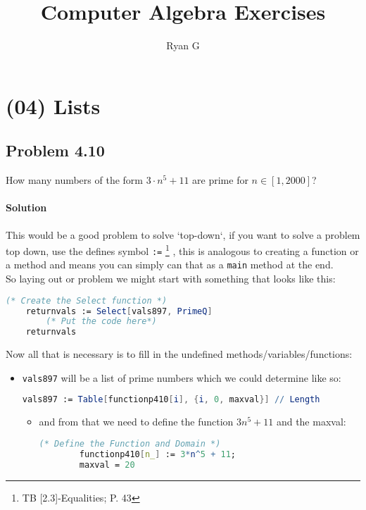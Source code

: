 \documentclass[12pt]{article}
\title{Computer Algebra Exercises}
\author{Ryan G}
\begin{document}
\maketitle

\tableofcontents

\selectfont

\section{(04) Lists}	
\subsection{Problem 4.10}
How many numbers of the form $3\cdot  n^5 +  11$ are prime for $n \in \left[ 1, 2000 \right]$?
\paragraph{Solution}
This would be a good problem to solve `top-down`, if you want to solve a problem top down, use the  defines symbol \verb|:=| \footnote{TB [2.3]-Equalities; P. 43} , this is analogous to creating a function or a method and means you can simply can that as a \verb|main|  method at the end.\\

So laying out or problem we might start with something that looks like this:

\begin{lstlisting}[language = Mathematica]
(* Create the Select function *)
    returnvals := Select[vals897, PrimeQ]
        (* Put the code here*)
    returnvals
\end{lstlisting}	

Now all that is necessary is to fill in the undefined methods/variables/functions:

\begin{itemize}
  \item \verb|vals897| will be a list of prime numbers which we could determine like so:
    \begin{lstlisting}[language = Mathematica]
         vals897 := Table[functionp410[i], {i, 0, maxval}] // Length
         \end{lstlisting}


         \begin{itemize}
           \item and from that we need to define the function $3n^5 +11$ and the maxval:
    \begin{lstlisting}[language = Mathematica]
        (* Define the Function and Domain *)
        functionp410[n_] := 3*n^5 + 11;
        maxval = 20
    \end{lstlisting}	

         \end{itemize}
\end{itemize}
\end{document}
